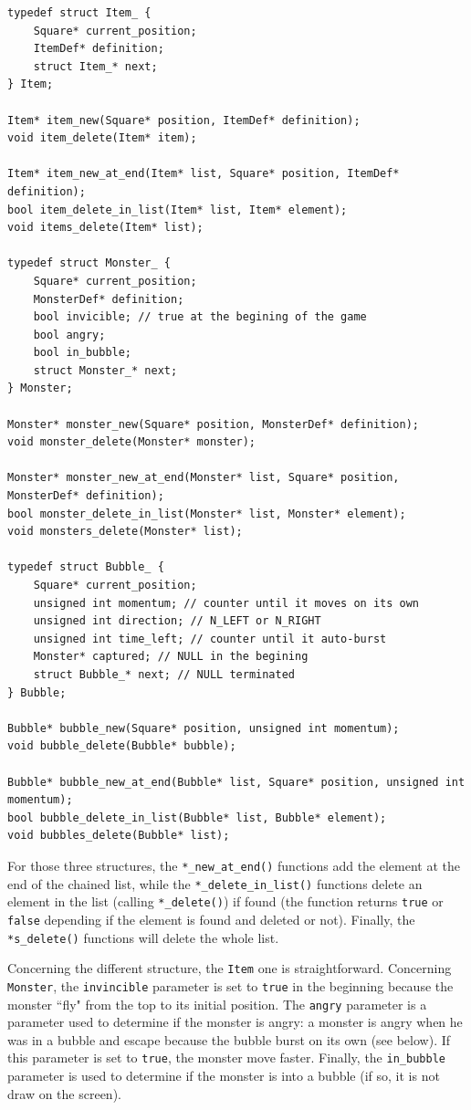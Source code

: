 \documentclass[12pt,a4paper]{article}
\begin{document}
\begin{verbatim}
typedef struct Item_ {
	Square* current_position;
	ItemDef* definition;
	struct Item_* next;
} Item;

Item* item_new(Square* position, ItemDef* definition);
void item_delete(Item* item);

Item* item_new_at_end(Item* list, Square* position, ItemDef* definition);
bool item_delete_in_list(Item* list, Item* element);
void items_delete(Item* list);

typedef struct Monster_ {
	Square* current_position;
	MonsterDef* definition;
	bool invicible; // true at the begining of the game
	bool angry;
	bool in_bubble;
	struct Monster_* next;
} Monster;

Monster* monster_new(Square* position, MonsterDef* definition);
void monster_delete(Monster* monster);

Monster* monster_new_at_end(Monster* list, Square* position, MonsterDef* definition);
bool monster_delete_in_list(Monster* list, Monster* element);
void monsters_delete(Monster* list);

typedef struct Bubble_ {
	Square* current_position;
	unsigned int momentum; // counter until it moves on its own
	unsigned int direction; // N_LEFT or N_RIGHT
	unsigned int time_left; // counter until it auto-burst
	Monster* captured; // NULL in the begining
	struct Bubble_* next; // NULL terminated
} Bubble;

Bubble* bubble_new(Square* position, unsigned int momentum);
void bubble_delete(Bubble* bubble);

Bubble* bubble_new_at_end(Bubble* list, Square* position, unsigned int momentum);
bool bubble_delete_in_list(Bubble* list, Bubble* element);
void bubbles_delete(Bubble* list);
\end{verbatim}

For those three structures, the  \texttt{*_new_at_end()} functions add the element at the end of the chained list, while the \texttt{*_delete_in_list()} functions delete an element in the list (calling \texttt{*_delete()}) if found (the function returns \texttt{true} or \texttt{false} depending if the element is found and deleted or not). Finally, the \texttt{*s_delete()} functions will delete the whole list.

Concerning the different structure, the \texttt{Item} one is straightforward. Concerning \texttt{Monster}, the \texttt{invincible} parameter is set to \texttt{true} in the beginning because the monster ``fly" from the top to its initial position. The \texttt{angry} parameter is a parameter used to determine if the monster is angry: a monster is angry when he was in a bubble and escape because the bubble burst on its own (see below). If this parameter is set to \texttt{true}, the monster move faster. Finally, the \texttt{in_bubble} parameter is used to determine if the monster is into a bubble (if so, it is not draw on the screen).
\end{document}
